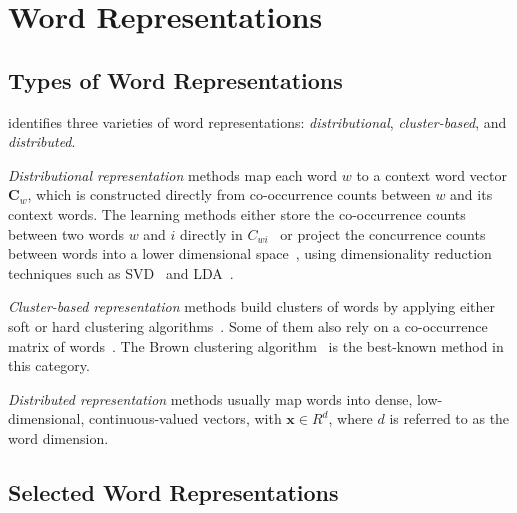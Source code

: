 \documentclass[11pt]{article}
\begin{document}
\section{Word Representations}
\label{wordrep} 

\subsection{Types of Word Representations}

 identifies three varieties of word
representations: \textit{distributional}, \textit{cluster-based}, and
\textit{distributed}.

\textit{Distributional representation} methods map each word $w$ to a
context word vector $\mathbf{C}_w$, which is constructed directly from
co-occurrence counts between $w$ and its context words.  The learning
methods either store the co-occurrence counts between two words $w$ and
$i$ directly in
$C_{wi}$~\cite{sahlgren2006word,turney2010frequency,honkela1997self} or
project the concurrence counts between words into a lower dimensional
space~\cite{vrehuuvrek2010software,lund1996producing}, using
dimensionality reduction techniques such as SVD~\cite{dumais1988using} and
LDA~\cite{blei2003latent}.

\textit{Cluster-based representation} methods build clusters of words by applying either soft or hard clustering algorithms~\cite{lin2009phrase,li2005semi}. Some of them also rely on a co-occurrence matrix of words~\cite{pereira1993distributional}. The Brown clustering algorithm~\cite{Brown92class-basedn-gram} is the best-known method in this category.

\textit{Distributed representation} methods usually map words into dense,
low-dimensional, continuous-valued vectors, with $\mathbf{x} \in
R^d$, where $d$ is referred to as the word dimension.

\subsection{Selected Word Representations}
\end{document}
